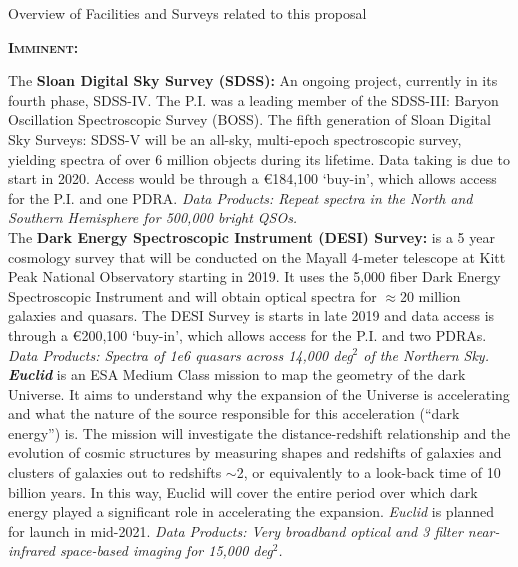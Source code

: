 \begin{framed}
\begin{tcolorbox}
\begin{center} 
  Overview of Facilities and Surveys related to this proposal
\end{center}
\end{tcolorbox}

\noindent
\textbf{\textsc{Imminent:}}

The {\bf Sloan Digital Sky Survey (SDSS):} An ongoing project,
currently in its fourth phase, SDSS-IV.  The P.I. was a leading member
of the SDSS-III: Baryon Oscillation Spectroscopic Survey (BOSS).  The
fifth generation of Sloan Digital Sky Surveys: SDSS-V will be an
all-sky, multi-epoch spectroscopic survey, yielding spectra of over 6
million objects during its lifetime. Data taking is due to start in
2020. Access would be through a \euro184,100 `buy-in', which allows
access for the P.I. and one PDRA.  {\it Data Products: Repeat spectra
in the North and Southern Hemisphere for 500,000 bright QSOs.} \\

The {\bf Dark Energy Spectroscopic Instrument (DESI) Survey:} is a 5
year cosmology survey that will be conducted on the Mayall 4-meter
telescope at Kitt Peak National Observatory starting in 2019. It uses
the 5,000 fiber Dark Energy Spectroscopic Instrument and will obtain
optical spectra for $\approx$20 million galaxies and quasars. The DESI
Survey is starts in late 2019 and data access is through a
\euro200,100 `buy-in', which allows access for the P.I. and two PDRAs.
{\it Data Products: Spectra of 1e6 quasars across 14,000 deg$^{2}$ of
the Northern Sky.} \\

\textit{\textbf{Euclid}} is an ESA Medium Class mission to map the
geometry of the dark Universe.  It aims to understand why the
expansion of the Universe is accelerating and what the nature of the
source responsible for this acceleration (``dark energy'') is.  The
mission will investigate the distance-redshift relationship and the
evolution of cosmic structures by measuring shapes and redshifts of
galaxies and clusters of galaxies out to redshifts $\sim$2, or
equivalently to a look-back time of 10 billion years. In this way,
Euclid will cover the entire period over which dark energy played a
significant role in accelerating the expansion.  {\it Euclid} is
planned for launch in mid-2021.  {\it Data Products: Very broadband
optical and 3 filter near-infrared space-based imaging for 15,000
deg$^2$.} \\


\end{framed}
